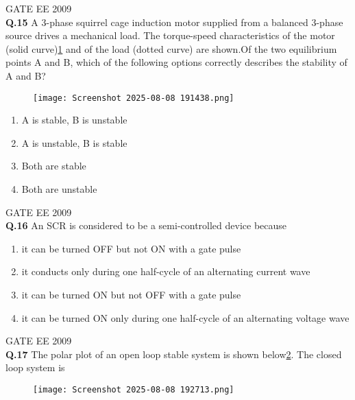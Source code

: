 \documentclass[12pt]{article}
\begin{document}
\hspace{10pt}
GATE EE 2009 \\





\noindent\textbf{Q.15} A 3-phase squirrel cage induction motor supplied from a balanced 3-phase source drives a mechanical load. The torque-speed characteristics of the motor (solid curve)\ref{fig:3} and of the load (dotted curve) are shown.Of the two equilibrium points A and B, which of the following options correctly describes the stability of A and B?
\begin{figure}[h]
    \centering

    \texttt{[image: Screenshot 2025-08-08 191438.png]}
    \label{fig:3}
\end{figure}

\begin{enumerate}
    \item A is stable, B is unstable
    \item A is unstable, B is stable
    \item Both are stable
    \item Both are unstable
\end{enumerate}

\vspace{0.5cm}
\hspace{10pt}
GATE EE 2009\\
\noindent\textbf{Q.16} An SCR is considered to be a semi-controlled device because

\begin{enumerate}
    \item it can be turned OFF but not ON with a gate pulse
    \item it conducts only during one half-cycle of an alternating current wave
    \item it can be turned ON but not OFF with a gate pulse
    \item it can be turned ON only during one half-cycle of an alternating voltage wave
\end{enumerate}

\vspace{0.5cm}
\hspace{10pt}
GATE EE 2009\\
\noindent\textbf{Q.17} The polar plot of an open loop stable system is shown below\ref{fig:4}. The closed loop system is

\begin{figure}[h!]
    \centering
    \texttt{[image: Screenshot 2025-08-08 192713.png]}
    \label{fig:4}
\end{figure}
\end{document}
